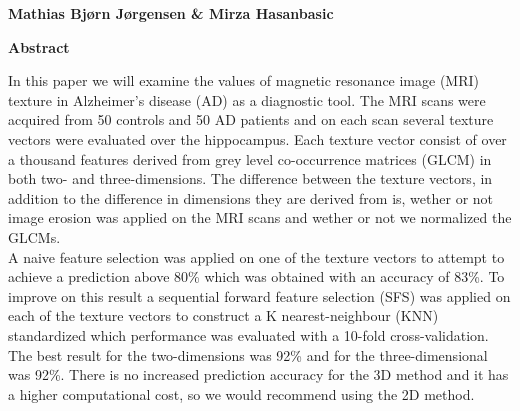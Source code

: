 \thispagestyle{plain}
\begin{center}
    \vspace{0.4cm}
    \textbf{Mathias Bjørn Jørgensen \& Mirza Hasanbasic}

    \vspace{0.9cm}
    \textbf{Abstract}
\end{center}

In this paper we will examine the values of magnetic resonance image (MRI) texture in Alzheimer's disease (AD) as a diagnostic tool. The MRI scans were acquired from 50 controls and 50 AD patients and on each scan several texture vectors were evaluated over the hippocampus. Each texture vector consist of over a thousand features derived from grey level co-occurrence matrices (GLCM) in both two- and three-dimensions. The difference between the texture vectors, in addition to the difference in dimensions they are derived from is, wether or not image erosion was applied on the MRI scans and wether or not we normalized the GLCMs.\\
A naive feature selection was applied on one of the texture vectors to attempt to achieve a prediction above 80\% which was obtained with an accuracy of 83\%. To improve on this result a sequential forward feature selection (SFS) was applied on each of the texture vectors to construct a K nearest-neighbour (KNN) standardized which performance was evaluated with a 10-fold cross-validation.\\
The best result for the two-dimensions was 92\% and for the three-dimensional was 92\%. There is no increased prediction accuracy for the 3D method and it has a higher computational cost, so we would recommend using the 2D method. 